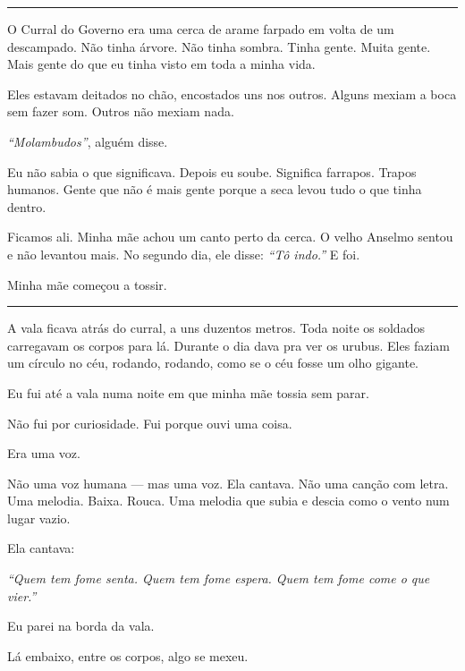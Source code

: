 \vspace{0.5em}\noindent\rule{\textwidth}{0.5pt}\vspace{0.5em}

\noindent O Curral do Governo era uma cerca de arame farpado em volta de um descampado. Não tinha árvore. Não tinha sombra. Tinha gente. Muita gente. Mais gente do que eu tinha visto em toda a minha vida.

\noindent Eles estavam deitados no chão, encostados uns nos outros. Alguns mexiam a boca sem fazer som. Outros não mexiam nada.

\noindent \textit{\textquotedblleft{}Molambudos\textquotedblright{}}, alguém disse.

\noindent Eu não sabia o que significava. Depois eu soube. Significa farrapos. Trapos humanos. Gente que não é mais gente porque a seca levou tudo o que tinha dentro.

\noindent Ficamos ali. Minha mãe achou um canto perto da cerca. O velho Anselmo sentou e não levantou mais. No segundo dia, ele disse: \textit{\textquotedblleft{}Tô indo.\textquotedblright{}} E foi.

\noindent Minha mãe começou a tossir.

\vspace{0.5em}\noindent\rule{\textwidth}{0.5pt}\vspace{0.5em}

\noindent A vala ficava atrás do curral, a uns duzentos metros. Toda noite os soldados carregavam os corpos para lá. Durante o dia dava pra ver os urubus. Eles faziam um círculo no céu, rodando, rodando, como se o céu fosse um olho gigante.

\noindent Eu fui até a vala numa noite em que minha mãe tossia sem parar.

\noindent Não fui por curiosidade.
Fui porque ouvi uma coisa.

\noindent Era uma voz.

\noindent Não uma voz humana --- mas uma voz. Ela cantava. Não uma canção com letra. Uma melodia. Baixa. Rouca. Uma melodia que subia e descia como o vento num lugar vazio.

\noindent Ela cantava:

\noindent \textit{\textquotedblleft{}Quem tem fome senta. Quem tem fome espera. Quem tem fome come o que vier.\textquotedblright{}}

\noindent Eu parei na borda da vala.

\noindent Lá embaixo, entre os corpos, algo se mexeu.

